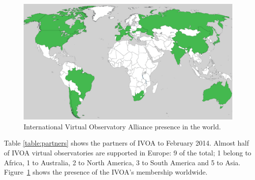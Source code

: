 \begin{figure}%
\begin{center}
	\includegraphics[width=0.9\linewidth]{img/VO-worldwide.png}
	\caption{International Virtual Observatory Alliance presence in the world.}
\end{center}
\label{figure:worldview}
\end{figure}


Table \ref{table:partners} shows the partners of IVOA to
February 2014. 
Almost half of IVOA virtual observatories are supported in Europe:
9 of
the total; 1 belong to Africa, 1 to Australia, 2 to North America, 3 to South
America and 5 to Asia. Figure~\ref{figure:worldview} shows the presence of the 
IVOA's membership worldwide.








